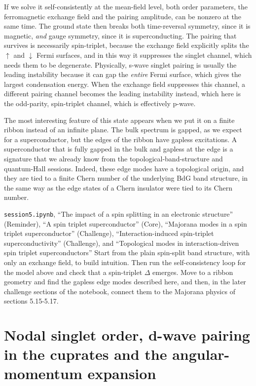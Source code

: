 If we solve it self-consistently at the mean-field level, both order parameters, the ferromagnetic
exchange field and the pairing amplitude, can be nonzero at the same time. The ground state then
breaks both time-reversal symmetry, since it is magnetic, \emph{and} gauge symmetry, since it is
superconducting. The pairing that survives is necessarily spin-triplet, because the exchange field
explicitly splits the $\uparrow$ and $\downarrow$ Fermi surfaces, and in this way it suppresses the
singlet channel, which needs them to be degenerate. Physically, s-wave singlet pairing is usually
the leading instability because it can gap the \emph{entire} Fermi surface, which gives the largest
condensation energy. When the exchange field suppresses this channel, a different pairing channel
becomes the leading instability instead, which here is the odd-parity, spin-triplet channel, which
is effectively p-wave.

The most interesting feature of this state appears when we put it on a finite ribbon instead of an
infinite plane. The bulk spectrum is gapped, as we expect for a superconductor, but the edges of the
ribbon have gapless excitations. A superconductor that is fully gapped in the bulk and gapless at
the edge is a signature that we already know from the topological-band-structure and quantum-Hall
sessions. Indeed, these edge modes have a topological origin, and they are tied to a finite Chern
number of the underlying BdG band structure, in the same way as the edge states of a Chern
insulator were tied to its Chern number.

\begin{notebookbox}{\texttt{session5.ipynb}, ``The impact of a spin splitting in an electronic structure'' (Reminder), ``A spin triplet superconductor'' (Core), ``Majorana modes in a spin triplet superconductor'' (Challenge), ``Interaction-induced spin-triplet superconductivity'' (Challenge), and ``Topological modes in interaction-driven spin triplet superconductors''}
Start from the plain spin-split band structure, with only an exchange field, to build intuition.
Then run the self-consistency loop for the model above and check that a spin-triplet $\Delta$
emerges. Move to a ribbon geometry and find the gapless edge modes described here, and then, in the
later challenge sections of the notebook, connect them to the Majorana physics of sections
5.15-5.17.
\end{notebookbox}

\section{Nodal singlet order, d-wave pairing in the cuprates and the angular-momentum expansion}

